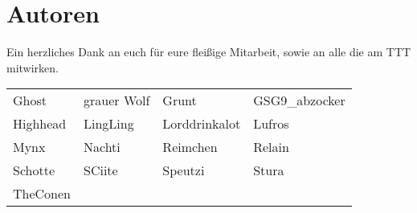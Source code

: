 \pagebreak
\chapter*{Autoren}
	Ein herzliches Dank an euch für eure fleißige Mitarbeit, sowie an alle die am \ac{TTT} mitwirken. 
	\par\bigskip
	\begin{tabular}{p{}p{}p{}p{}}
		Ghost & 
		grauer Wolf &
		Grunt &
		GSG9\_abzocker\\
		Highhead &
		LingLing & 
		Lorddrinkalot &
		Lufros\\
		Mynx &
		Nachti &
		Reimchen &
		Relain\\
		Schotte &
		SCiite &
		Speutzi &
		Stura \\
		TheConen\\
	\end{tabular}	